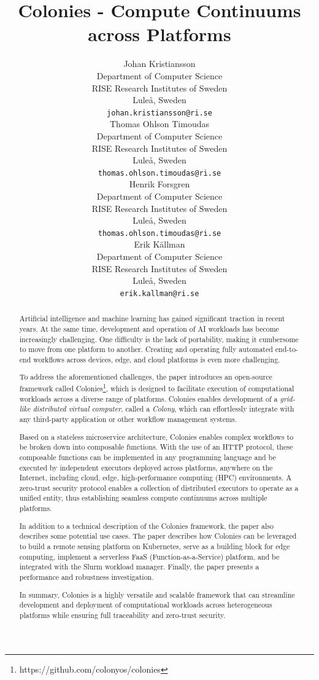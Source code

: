 \documentclass{article}
\title{Colonies - Compute Continuums across Platforms}
\author{{\hspace{1mm}Johan Kristiansson} \\
	Department of Computer Science \\
	RISE Research Institutes of Sweden \\
	Luleå, Sweden \\
	\texttt{johan.kristiansson@ri.se} \\
	\And
	{\hspace{1mm}Thomas Ohlson Timoudas} \\
	Department of Computer Science \\
	RISE Research Institutes of Sweden \\
	Luleå, Sweden \\
	\texttt{thomas.ohlson.timoudas@ri.se} \\
	\And
	{\hspace{1mm}Henrik Forsgren} \\
	Department of Computer Science \\
	RISE Research Institutes of Sweden \\
	Luleå, Sweden \\
	\texttt{thomas.ohlson.timoudas@ri.se} \\
	\And
	{\hspace{1mm}Erik Källman} \\
	Department of Computer Science \\
	RISE Research Institutes of Sweden \\
	Luleå, Sweden \\
	\texttt{erik.kallman@ri.se} \\
}
\begin{document}
\maketitle

\begin{abstract}
Artificial intelligence and machine learning has gained significant traction in recent years. At the same time, development and operation of AI workloads has become increasingly challenging. One difficulty is the lack of portability, making it cumbersome to move from one platform to another. Creating and operating fully automated end-to-end workflows across devices, edge, and cloud platforms is even more challenging.

To address the aforementioned challenges, the paper introduces an open-source framework called Colonies\footnote{https://github.com/colonyos/colonies}, which is designed to facilitate execution of computational workloads across a diverse range of platforms. Colonies enables development of a \emph{grid-like distributed virtual computer}, called a \emph{Colony}, which can effortlessly integrate with any third-party application or other workflow management systems.

Based on a stateless microservice architecture, Colonies enables complex workflows to be broken down into composable functions. With the use of an HTTP protocol, these composable functions can be implemented in any programming language and be executed by independent executors deployed across platforms, anywhere on the Internet, including cloud, edge, high-performance computing (HPC) environments. A zero-trust security protocol enables a collection of distributed executors to operate as a unified entity, thus establishing seamless compute continuums across multiple platforms.

In addition to a technical description of the Colonies framework, the paper also describes some potential use cases. The paper describes how Colonies can be leveraged to build a remote sensing platform on Kubernetes, serve as a building block for edge computing, implement a serverless FaaS (Function-as-a-Service) platform, and be integrated with the Slurm workload manager. Finally, the paper presents a performance and robustness investigation.

In summary, Colonies is a highly versatile and scalable framework that can streamline development and deployment of computational workloads across heterogeneous platforms while ensuring full traceability and zero-trust security.
\end{abstract}
\end{document}
